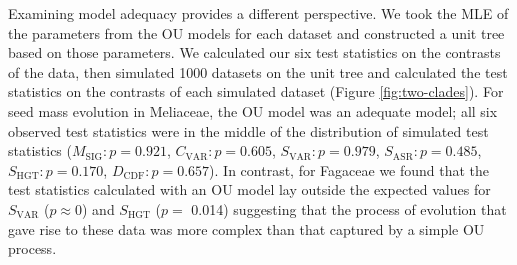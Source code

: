 Examining model adequacy provides a different perspective. We took the MLE of the parameters from the OU models for each dataset and constructed a unit tree based on those parameters. We calculated our six test statistics on the contrasts of the data, then simulated 1000 datasets on the unit tree and calculated the test statistics on the contrasts of each simulated dataset (Figure \ref{fig:two-clades}). For seed mass evolution in Meliaceae, the OU model was an adequate model; all six observed test statistics were in the middle of the distribution of simulated test statistics ($M_{\text{SIG}}: p=\text{0.921}$, $C_{\text{VAR}}: p=\text{0.605}$, $S_{\text{VAR}}: p=\text{0.979}$, $S_{\text{ASR}}:p=\text{0.485}$, $S_{\text{HGT}}: p=\text{0.170}$, $D_{\text{CDF}}: p=\text{0.657}$). In contrast, for Fagaceae we found that the test statistics calculated with an OU model lay outside the expected values for $S_{\text{VAR}}$ ($p \approx \text{0}$) and $S_{\text{HGT}}$ ($p =$ 0.014) suggesting that the process of evolution that gave rise to these data was more complex than that captured by a simple OU process. 


